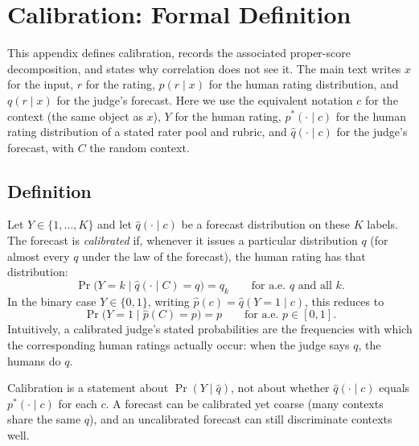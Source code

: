 
\section{Calibration: Formal Definition}
\label{app:calibration}

This appendix defines calibration, records the associated proper-score decomposition, and states why correlation does not see it.
The main text writes $x$ for the input, $r$ for the rating, $p(r\mid x)$ for the human rating distribution, and $q(r\mid x)$ for the judge's forecast.
Here we use the equivalent notation $c$ for the context (the same object as $x$), $Y$ for the human rating, $p^*(\cdot\mid c)$ for the human rating distribution of a stated rater pool and rubric, and $\hat q(\cdot\mid c)$ for the judge's forecast, with $C$ the random context.

\subsection{Definition}
Let $Y\in\{1,\dots,K\}$ and let $\hat q(\cdot\mid c)$ be a forecast distribution on these $K$ labels.
The forecast is \emph{calibrated} if, whenever it issues a particular distribution $q$ (for almost every $q$ under the law of the forecast), the human rating has that distribution:
\begin{equation}
\label{eq:calibration}
\Pr\bigl(Y=k \mid \hat q(\cdot\mid C)=q\bigr)
=
q_k
\qquad\text{for a.e.\ }q\text{ and all }k.
\end{equation}
In the binary case $Y\in\{0,1\}$, writing $\hat p(c)=\hat q(Y=1\mid c)$, this reduces to
\begin{equation}
\label{eq:calibration-binary}
\Pr\bigl(Y=1 \mid \hat p(C)=p\bigr)
=
p
\qquad\text{for a.e.\ }p\in[0,1].
\end{equation}
Intuitively, a calibrated judge's stated probabilities are the frequencies with which the corresponding human ratings actually occur: when the judge says $q$, the humans do $q$.

Calibration is a statement about $\Pr(Y\mid\hat q)$, not about whether $\hat q(\cdot\mid c)$ equals $p^*(\cdot\mid c)$ for each $c$.
A forecast can be calibrated yet coarse (many contexts share the same $q$), and an uncalibrated forecast can still discriminate contexts well.

